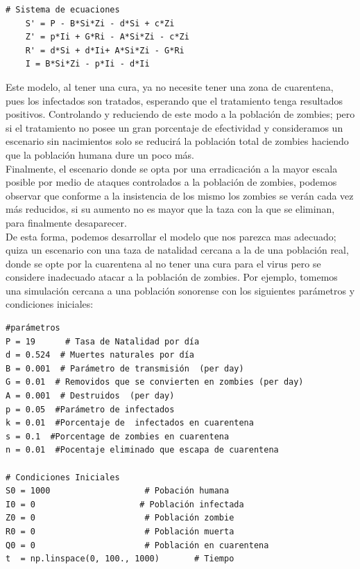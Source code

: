 \documentclass[12pt]{article}
\begin{document}
\begin{verbatim}
# Sistema de ecuaciones
    S' = P - B*Si*Zi - d*Si + c*Zi 
    Z' = p*Ii + G*Ri - A*Si*Zi - c*Zi 
    R' = d*Si + d*Ii+ A*Si*Zi - G*Ri 
    I = B*Si*Zi - p*Ii - d*Ii  
\end{verbatim} 

Este modelo, al tener una cura, ya no necesite tener una zona de cuarentena, pues los infectados son tratados, esperando que el tratamiento tenga resultados positivos. Controlando y reduciendo de este modo a la población de zombies; pero si el tratamiento no posee un gran porcentaje de efectividad y consideramos un escenario sin nacimientos solo se reducirá la población total de zombies haciendo que la población humana dure un poco más.\\

Finalmente, el escenario donde se opta por una erradicación a la mayor escala posible por medio de ataques controlados a la población de zombies, podemos observar que conforme a la insistencia de los mismo los zombies se verán cada vez más reducidos, si su aumento no es mayor que la taza con la que se eliminan, para finalmente desaparecer.\\

De esta forma, podemos desarrollar el modelo que nos parezca mas adecuado; quiza un escenario con una taza de natalidad cercana a la de una población real, donde se opte por la cuarentena al no tener una cura para el virus pero se considere inadecuado atacar a la poblaci\'on de zombies. Por ejemplo, tomemos una simulación cercana a una población sonorense con los siguientes parámetros y condiciones iniciales:

\begin{verbatim}
#parámetros
P = 19      # Tasa de Natalidad por día
d = 0.524  # Muertes naturales por día
B = 0.001  # Parámetro de transmisión  (per day)
G = 0.01  # Removidos que se convierten en zombies (per day)
A = 0.001  # Destruidos  (per day)
p = 0.05  #Parámetro de infectados
k = 0.01  #Porcentaje de  infectados en cuarentena
s = 0.1  #Porcentage de zombies en cuarentena
n = 0.01  #Pocentaje eliminado que escapa de cuarentena

# Condiciones Iniciales
S0 = 1000                   # Pobación humana
I0 = 0                     # Población infectada
Z0 = 0                      # Población zombie
R0 = 0                      # Población muerta
Q0 = 0                      # Población en cuarentena
t  = np.linspace(0, 100., 1000)       # Tiempo
\end{verbatim}
\end{document}
